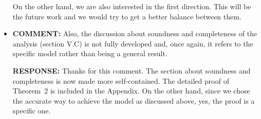 \documentclass[10pt,journal]{IEEEtran}
\newcommand{\ANSWER}{{\bf RESPONSE: }}
\newcommand{\COMMENT}{{\bf COMMENT: }}
\begin{document}
\begin{itemize}
On the other hand, we are also interested in the first direction. This
will be the future work and we would try to get a better balance
between them.

\item
\COMMENT Also, the discussion about soundness and completeness of the
analysis (section V.C) is not fully developed and, once again, it
refers to the specific model rather than being a general result.

\ANSWER Thanks for this comment. The section about soundness and
completeness is now made more self-contained. The detailed proof of
Theorem~2 is included in the Appendix. On the other hand, since we
chose the accurate way to achieve the model as discussed above, yes,
the proof is a specific one.

\end{itemize}
\end{document}
